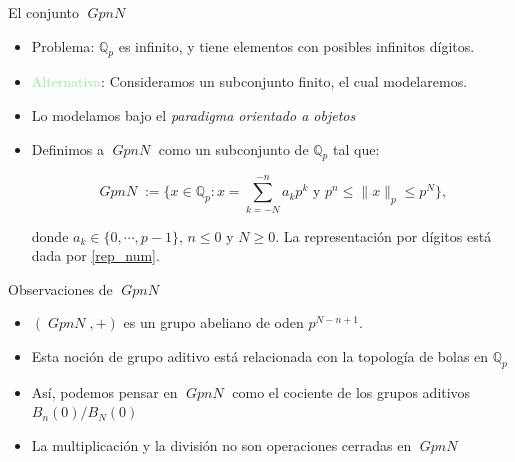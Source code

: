 \documentclass{beamer}
\theoremstyle{definition}
\numberwithin{equation}{section}
\newcommand{\tit}[1]{\textit{#1}}
\renewcommand{\geq}{\geqslant}
\renewcommand{\leq}{\leqslant}
\newcommand{\Qp}{\mathbb{Q}_p}
\newcommand{\pnorm}[1]{\|#1\|_p}
\DeclareMathOperator{\gpn}{\mathit{{GpnN}}}
\begin{document}
\begin{frame}{El conjunto $\gpn$}
	\begin{itemize}[<+- | alert@+>]
		\item \textcolor{orangeBar}{Problema}: $\Qp$ es infinito, y tiene elementos con posibles infinitos dígitos.
		\item \textcolor{lightGreen}{Alternativa}: Consideramos un subconjunto finito, el cual modelaremos.
		\item Lo modelamos bajo el \tit{paradigma orientado a objetos}
		\item Definimos a $\gpn$ como un subconjunto de $\Qp$ tal que:
		
		
		
		\begin{equation}\label{GpnN}
		\gpn := \Big\{x\in \Qp : x = \sum_{k=-N}^{-n} a_{k} p^{k} \text{ y } p^{n}\leq \pnorm{x}\leq p^N\Big \},
		\end{equation}
		
		donde $a_k\in \{0,\cdots,p-1\}$, $n\leq0$ y $N\geq 0$. La representación por dígitos está dada por \ref{rep_num}.
		
	\end{itemize}
\end{frame}

\begin{frame}{Observaciones de $\gpn$}
	\begin{itemize}[<+- | alert@+>]
		\item $   (\gpn,+)$ es un grupo abeliano de oden $p^{N-n+1}$.
		\item Esta noción de grupo aditivo está relacionada con la topología de bolas en $\Qp$
		\item Así, podemos pensar en $\gpn$ como el cociente de los grupos aditivos $B_n   (0)/B_N   (0)$
		\item  La  multiplicación y la división no son operaciones cerradas en $\gpn$
	\end{itemize}
\end{frame}
\end{document}
